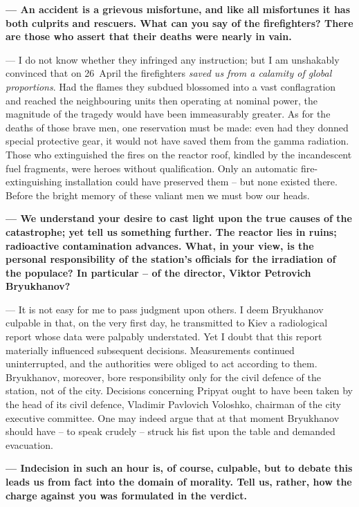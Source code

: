 \documentclass[openright]{bookest}
\begin{document}
\medskip

\textbf{--- An accident is a grievous misfortune, and like all misfortunes it has both culprits and rescuers. What can you say of the firefighters? There are those who assert that their deaths were nearly in vain.}

\noindent
--- I do not know whether they infringed any instruction; but I am unshakably convinced that on 26~April the firefighters \textit{saved us from a calamity of global proportions}. Had the flames they subdued blossomed into a vast conflagration and reached the neighbouring units then operating at nominal power, the magnitude of the tragedy would have been immeasurably greater. As for the deaths of those brave men, one reservation must be made: even had they donned special protective gear, it would not have saved them from the gamma radiation. Those who extinguished the fires on the reactor roof, kindled by the incandescent fuel fragments, were heroes without qualification. Only an automatic fire-extinguishing installation could have preserved them -- but none existed there. Before the bright memory of these valiant men we must bow our heads.

\medskip

\textbf{--- We understand your desire to cast light upon the true causes of the catastrophe; yet tell us something further. The reactor lies in ruins; radioactive contamination advances. What, in your view, is the personal responsibility of the station's officials for the irradiation of the populace? In particular -- of the director, Viktor Petrovich Bryukhanov?}

\noindent
--- It is not easy for me to pass judgment upon others. I deem Bryukhanov culpable in that, on the very first day, he transmitted to Kiev a radiological report whose data were palpably understated. Yet I doubt that this report materially influenced subsequent decisions. Measurements continued uninterrupted, and the authorities were obliged to act according to them. Bryukhanov, moreover, bore responsibility only for the civil defence of the station, not of the city. Decisions concerning Pripyat ought to have been taken by the head of its civil defence, Vladimir Pavlovich Voloshko, chairman of the city executive committee. One may indeed argue that at that moment Bryukhanov should have -- to speak crudely -- struck his fist upon the table and demanded evacuation.

\medskip

\textbf{--- Indecision in such an hour is, of course, culpable, but to debate this leads us from fact into the domain of morality. Tell us, rather, how the charge against you was formulated in the verdict.}
\end{document}
